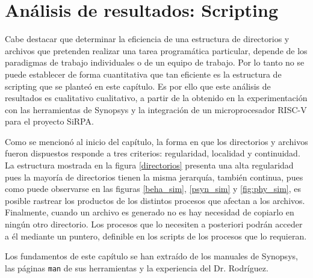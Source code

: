 \section{Análisis de resultados: Scripting }

Cabe destacar que determinar la eficiencia de una estructura de directorios y archivos que pretenden realizar una tarea programática particular, depende de los paradigmas de trabajo individuales o de un equipo de trabajo. Por lo tanto no se puede establecer de forma cuantitativa que tan eficiente es la estructura de scripting que se planteó en este capítulo. Es por ello que este análisis de resultados es cualitativo cualitativo, a partir de la obtenido en la experimentación con las herramientas de Synopsys y la integración de un microprocesador RISC-V para el proyecto SiRPA.

Como se mencionó al inicio del capítulo, la forma en que los directorios y archivos fueron dispuestos responde a tres criterios: regularidad, localidad y continuidad. La estructura mostrada en la figura \ref{directorios} presenta una alta regularidad pues la mayoría de directorios tienen la misma jerarquía, también continua, pues como puede observarse en las figuras \ref{beha_sim}, \ref{psyn_sim} y \ref{fig:phy_sim}, es posible rastrear los productos de los distintos procesos que afectan a los archivos. Finalmente, cuando un archivo es generado no es hay necesidad de copiarlo en ningún otro directorio. Los procesos que lo necesiten a posteriori podrán acceder a él mediante un puntero, definible en los scripts de los procesos que lo requieran.

Los fundamentos de este capítulo se han extraído de los manuales de Synopsys, las páginas \texttt{man} de sus herramientas y la experiencia del Dr. Rodríguez.